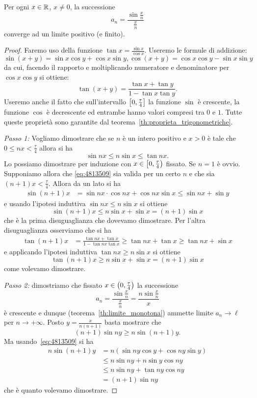 \begin{theorem}
Per ogni $x\in {\mathbb R}$, $x\neq 0$, la successione
\[
    a_n = \frac{\sin \frac xn} {\frac xn}
\]
converge ad un limite positivo (e finito).
\end{theorem}
%
\begin{proof}
Faremo uso della funzione $\tan x= \frac{\sin x}{\cos x}$.
Useremo le formule di addizione:
\[
 \sin(x+y) = \sin x\cos y + \cos x \sin y,
 \cos(x+y) = \cos x \cos y - \sin x \sin y  
\]
da cui, facendo il rapporto e moltiplicando numeratore 
e denominatore per $\cos x \cos y$ si ottiene:
\[
  \tan(x+y) = \frac{\tan x + \tan y}{1-\tan x \tan y}.
\]
Useremo anche il fatto che sull'intervallo 
$\left[0,\frac \tau 4\right]$
la funzione $\sin$ è crescente, la funzione $\cos $
è decrescente ed entrambe hanno valori compresi 
tra $0$ e $1$.
Tutte queste proprietà sono garantite 
dal teorema~\ref{th:proprieta_trigonometriche}.

\emph{Passo 1:}
Vogliamo dimostrare che se $n$ è un intero positivo 
e $x>0$ è tale che $0\le nx <\frac \tau 4$ allora si ha
\begin{equation}\label{eq:4813509}
  \sin n x \le n\sin x\le \tan nx.
\end{equation}
Lo possiamo dimostrare per induzione con $x\in\left[0,\frac \tau 4\right)$
fissato.
Se $n=1$ è ovvio.
Supponiamo allora che \eqref{eq:4813509} 
sia valida per un certo $n$ e che  
sia $(n+1)x<\frac \tau 4$. 
Allora da un lato si ha
\begin{align*}
  \sin (n+1)x 
  &= \sin nx \cdot \cos nx + \cos nx\sin x
  \le \sin nx + \sin y
\end{align*}
e usando l'ipotesi induttiva $\sin nx\le n\sin x$ 
si ottiene 
\[
 \sin(n+1)x \le n\sin x+\sin x = (n+1)\sin x  
\]
che è la prima disuguaglianza che dovevamo dimostrare.
Per l'altra disuguaglianza osserviamo che si ha 
\begin{align*}
  \tan(n+1)x 
  &= \frac{\tan nx + \tan x}{1-\tan nx \tan x}
  \ge \tan nx + \tan x
  \ge \tan nx + \sin x
\end{align*}
e applicando l'ipotesi induttiva 
$\tan nx\ge n\sin x$ si ottiene 
\[
 \tan(n+1)x 
 \ge n\sin x +\sin x 
 =   (n+1)\sin x
\]
come volevamo dimostrare.

\emph{Passo 2:}
dimostriamo che fissato $x\in \left(0,\frac \tau 4\right)$ 
la successione 
\[
  a_n = \frac{\sin \frac x n}{\frac x n} = \frac{n\sin \frac x n}{x}
\]
è crescente e dunque
(teorema~\ref{th:limite_monotona})
ammette limite $a_n \to \ell$ per $n\to +\infty$.
Posto $y=\frac{x}{n(n+1)}$ basta mostrare che 
\[
  (n+1) \sin ny \ge n \sin (n+1)y.  
\]
Ma usando~\eqref{eq:4813509} si ha 
\begin{align*}
  n \sin(n+1)y
  &=n(\sin ny\cos y + \cos ny \sin y) \\
  &\le n\sin ny + n\sin y\cos ny\\
  &\le n\sin ny + \tan ny\cos ny\\
  &= (n+1)\sin ny
\end{align*}
che è quanto volevamo dimostrare.


\end{proof}

